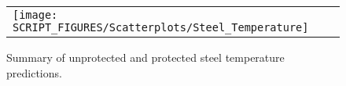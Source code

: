 \begin{figure}[!ht]
\begin{center}
\begin{tabular}{l}
\texttt{[image: SCRIPT\_FIGURES/Scatterplots/Steel\_Temperature]}
\end{tabular}
\end{center}
\caption[Summary of steel temperature predictions]
{Summary of unprotected and protected steel temperature predictions.}
\label{Surface_Temperature_Steel_Summary}
\end{figure}

